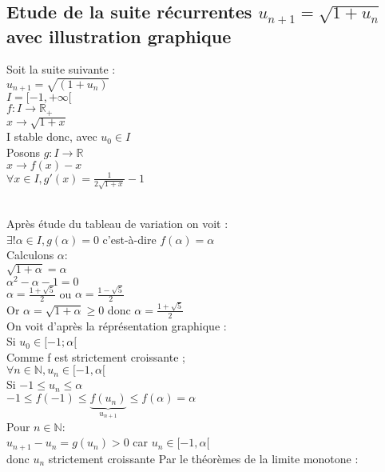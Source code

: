 \documentclass{article}
\begin{document}
\subsection{Etude de la suite récurrentes $u_{n+1}= \sqrt{1+u_n}$ avec illustration graphique}
Soit la suite suivante : \\ 
$u_{n+1}=\sqrt{(1+u_n)}$ \\ 
$I=[-1,+\infty[$ \\ 
$f:I \rightarrow \mathbb{R}_+$ \\ 
$x \rightarrow \sqrt{1+x}$ \\ 
I stable donc, avec $u_0\in I$ \\ 
Posons $g : I \rightarrow \mathbb{R}$ \\ 
$x \rightarrow f(x)-x$ \\ 
$\forall x \in I, g'(x)=\frac{1}{2\sqrt{1+x}}-1$ \\ 
\\
Après étude du tableau de variation on voit : \\ 
$\exists ! \alpha \in I, g(\alpha)=0$ c'est-à-dire $f(\alpha)=\alpha$ \\ 
Calculons $\alpha$: \\ 
$\sqrt{1+ \alpha}= \alpha$ \\ 
$\alpha^2-\alpha-1=0$ \\ 
$\alpha=\frac{1+\sqrt{5}}{2}$ ou $\alpha=\frac{1-\sqrt{5}}{2}$ \\ 
Or $\alpha=\sqrt{1+\alpha} \geq 0$ donc $\alpha=\frac{1+\sqrt{5}}{2}$ \\
On voit d'après la réprésentation graphique : \\ 
Si $u_0 \in [-1;\alpha[$ \\ 
Comme f est strictement croissante ; \\ 
$\forall n \in \mathbb{N},u_n \in [-1,\alpha[$ \\ 
Si $-1 \leq u_n \leq \alpha$ \\ 
$-1\leq f(-1) \leq \underbrace{f(u_n)}_{u_{n+1}} \leq f(\alpha)=\alpha$ \\ 
Pour $n \in \mathbb{N}$: \\ 
$u_{n+1}-u_n=g(u_n)>0$ car $u_n \in [-1,\alpha[$\\
donc $u_n$ strictement croissante
Par le théorèmes de la limite monotone : \\ 
\end{document}
